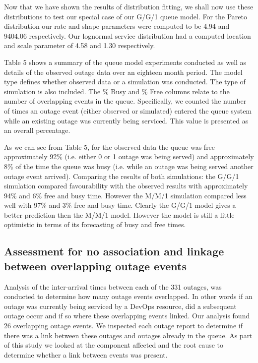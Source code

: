 \documentclass[5p]{elsarticle}
\begin{document}
Now that we have shown the results of distribution fitting, we shall now use these distributions to test our special case of our G/G/1 queue model. For the Pareto distribution our rate and shape parameters were computed to be 4.94 and 9404.06 respectively. Our 
lognormal service distribution had a computed location and scale parameter of 4.58 and 1.30 respectively.

Table 5 shows a summary of the queue model experiments conducted as well as details of the observed outage data over an eighteen month period. The model type defines whether observed data or a simulation was conducted. The type of simulation is also included. The \% Busy and \% Free columns relate to the number of overlapping events in the queue. Specifically, we counted the number of times an outage event (either observed or simulated) entered the queue system while an existing outage was currently being serviced. This value is presented as an overall percentage. 

As we can see from Table 5, for the observed data the queue was free approximately 92\% (i.e. either 0 or 1 outage was being served) and approximately 8\% of the time the queue was busy (i.e. while an outage was being served another outage event arrived). Comparing the results of both simulations: the G/G/1 simulation compared favourability with the observed results with approximately 94\% and 6\% free and busy time. However the M/M/1 simulation compared less well with 97\% and 3\% free and busy time. Clearly the G/G/1 model gives a better prediction then the M/M/1 model. However the model is still a little optimistic in terms of its forecasting of busy and free times.

\subsection{Assessment for no association and linkage between overlapping outage events}

Analysis of the inter-arrival times between each of the 331 outages, was conducted to determine how many outage events overlapped. In other words if an outage was currently being serviced by a DevOps resource, did a subsequent outage occur and if so where these overlapping events linked. Our analysis found 26 overlapping outage events. We inspected each outage report to determine if there was a link between these outages and outages already in the queue. As part of this study we looked at the component affected and the root cause to determine whether a link between events was present. 
\end{document}
